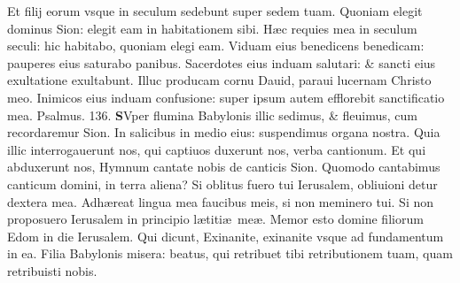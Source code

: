 \documentclass[a5paper,10pt]{book}
\def\ae{æ}
\begin{document}
\begin{multicols*}{2}
\newline \color{red} E\color{black}t filij eorum vsque in seculum sedebunt super sedem tuam.
\newline \color{red} Q\color{black}uoniam elegit dominus Sion: elegit eam in habitationem sibi.
\newline \color{red} H\color{black}\ae c requies mea in seculum seculi: hic habitabo, quoniam elegi eam.
\newline \color{red} V\color{black}iduam eius benedicens benedicam: pauperes eius saturabo panibus.
\newline \color{red} S\color{black}acerdotes eius induam salutari: \& sancti eius exultatione exultabunt.
\newline \color{red} I\color{black}lluc producam cornu Dauid, paraui lucernam Christo meo.
\newline \color{red} I\color{black}nimicos eius induam confusione: super ipsum autem efflorebit sanctificatio mea. \quad \color{red} Psalmus. \hypertarget{ps136}{136.} \color{black}
\lettrine[lines=2]{\bfseries \color{red} S}{}Vper flumina Babylonis illic sedimus, \& fleuimus, cum recordaremur Sion.
\newline \color{red} I\color{black}n salicibus in medio eius: suspendimus organa nostra.
\newline \color{red} Q\color{black}uia illic interrogauerunt nos, qui captiuos duxerunt nos, verba cantionum.
\newline \color{red} E\color{black}t qui abduxerunt nos, Hymnum cantate nobis de canticis Sion.
\newline \color{red} Q\color{black}uomodo cantabimus canticum domini, in terra aliena?
\newline \color{red} S\color{black}i oblitus fuero tui Ierusalem, obliuioni detur dextera mea.
\newline \color{red} A\color{black}dh\ae reat lingua mea faucibus meis, si non meminero tui.
\newline \color{red} S\color{black}i non proposuero Ierusalem in principio l\ae titi\ae \ me\ae .
\newline \color{red} M\color{black}emor esto domine filiorum Edom in die Ierusalem.
\newline \color{red} Q\color{black}ui dicunt, Exinanite, exinanite vsque ad fundamentum in ea.
\newline \color{red} F\color{black}ilia Babylonis misera: beatus, qui retribuet tibi retributionem tuam, quam retribuisti nobis.

\end{multicols*}
\end{document}

